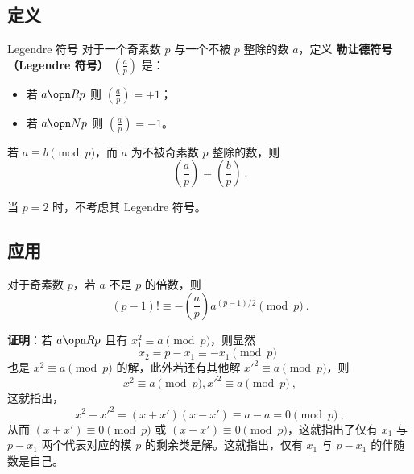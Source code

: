 
\subsection{定义}
\begin{definition}{Legendre 符号}
对于一个奇素数 $p$ 与一个不被 $p$ 整除的数 $a$，定义 \textbf{勒让德符号（Legendre 符号）} $\left( \frac{a}{p} \right)$ 是：
\begin{itemize}
\item 若 $a \opn R p$ 则 $\left( \frac{a}{p} \right) = +1$；
\item 若 $a \opn N p$ 则 $\left( \frac{a}{p} \right) = -1$。
\end{itemize}
\end{definition}

\begin{corollary}{}
若 $a \equiv b \pmod p$，而 $a$ 为不被奇素数 $p$ 整除的数，则
\begin{equation}
\left(\frac ap \right) = \left(\frac bp \right) ~.
\end{equation}

\end{corollary}

当 $p=2$ 时，不考虑其 Legendre 符号。

\subsection{应用}
\begin{theorem}{}\label{the_legnnt_1}
对于奇素数 $p$，若 $a$ 不是 $p$ 的倍数，则
\begin{equation}
(p-1)! \equiv -\left(\frac ap\right) a^{(p-1)/2} \pmod p ~.
\end{equation}
\end{theorem}
\textbf{证明}：若 $a \opn R p$ 且有 $x_1^2 \equiv a \pmod p$，则显然
\begin{equation}
x_2 = p-x_1 \equiv -x_1 \pmod p ~~
\end{equation}
也是 $x^2 \equiv a \pmod p$ 的解，此外若还有其他解 $x'^2 \equiv a \pmod p$，则
\begin{equation}
x^2 \equiv a \pmod p, x'^2 \equiv a \pmod p ~,
\end{equation}
这就指出，
\begin{equation}
x^2 - x'^2 = (x+x')(x-x') \equiv a - a = 0 \pmod p ~,
\end{equation}
从而 $(x+x') \equiv 0 \pmod p$ 或 $(x-x') \equiv 0 \pmod p$，这就指出了仅有 $x_1$ 与 $p-x_1$ 两个代表对应的模 $p$ 的剩余类是解。这就指出，仅有 $x_1$ 与 $p-x_1$ 的伴随数是自己。

